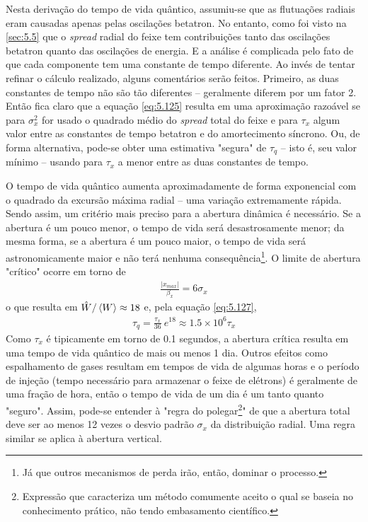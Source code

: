 Nesta derivação do tempo de vida quântico, assumiu-se que as flutuações radiais eram causadas apenas pelas oscilações betatron. No entanto, como foi visto na \autoref{sec:5.5} que o \textit{spread} radial do feixe tem contribuições tanto das oscilações betatron quanto das oscilações de energia. E a análise é complicada pelo fato de que cada componente tem uma constante de tempo diferente. Ao invés de tentar refinar o cálculo realizado, alguns comentários serão feitos. Primeiro, as duas constantes de tempo não são tão diferentes -- geralmente diferem por um fator 2. Então fica claro que a equação \eqref{eq:5.125} resulta em uma aproximação razoável se para $\sigma_x^2$ for usado o quadrado médio do \textit{spread} total do feixe e para $\tau_x$ algum valor entre as constantes de tempo betatron e do amortecimento síncrono. Ou, de forma alternativa, pode-se obter uma estimativa "segura" de $\tau_q$ -- isto é, seu valor mínimo -- usando para $\tau_x$ a menor entre as duas constantes de tempo.

O tempo de vida quântico aumenta aproximadamente de forma exponencial com o quadrado da excursão máxima radial --  uma variação extremamente rápida. Sendo assim, um critério mais preciso para a abertura dinâmica é necessário. Se a abertura é um pouco menor, o tempo de vida será desastrosamente menor; da mesma forma, se a abertura é um pouco maior, o tempo de vida será astronomicamente maior e não terá nenhuma consequência\footnote{Já que outros mecanismos de perda irão, então, dominar o processo.}. O limite de abertura "crítico" ocorre em torno de
\begin{align}
	\frac{|x_{max}|}{\beta_x} = 6\sigma_x
\end{align}
o que resulta em $\hat{W}/\left< W \right> \approx 18$ e, pela equação \eqref{eq:5.127},
\begin{align}
	\tau_q = \frac{\tau_x}{36}\ e^{18} \approx 1.5 \times 10^6 \tau_x
\end{align}
Como $\tau_x$ é tipicamente em torno de 0.1 segundos, a abertura crítica resulta em uma tempo de vida quântico de mais ou menos 1 dia. Outros efeitos como espalhamento de gases resultam em tempos de vida de algumas horas e o período de injeção (tempo necessário para armazenar o feixe de elétrons) é geralmente de uma fração de hora, então o tempo de vida de um dia é um tanto quanto "seguro". Assim, pode-se entender à "regra do polegar\footnote{Expressão que caracteriza um método comumente aceito o qual se baseia no conhecimento prático, não tendo embasamento científico.}" de que a abertura total deve ser ao menos 12 vezes o desvio padrão $\sigma_x$ da distribuição radial. Uma regra similar se aplica à abertura vertical.